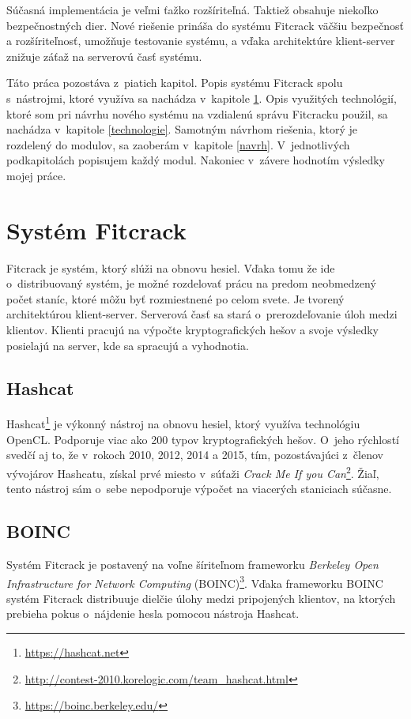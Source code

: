\documentclass[slovak]{fitthesis}
\begin{document}
Súčasná implementácia je veľmi ťažko rozšíriteľná. Taktiež obsahuje niekoľko bezpečnostných dier. Nové riešenie prináša do systému Fitcrack väčšiu bezpečnosť a rozšíriteľnosť, umožňuje testovanie systému, a vďaka architektúre klient-server znižuje záťaž na serverovú časť systému.

Táto práca pozostáva z~piatich kapitol. Popis systému Fitcrack spolu s~nástrojmi, ktoré využíva sa nachádza v~kapitole \ref{Fitcrack}. Opis využitých technológií, ktoré som pri návrhu nového systému na vzdialenú správu Fitcracku použil, sa nachádza v~kapitole \ref{technologie}. Samotným návrhom riešenia, ktorý je rozdelený do modulov, sa zaoberám v~kapitole \ref{navrh}. V~jednotlivých podkapitolách popisujem každý modul. Nakoniec v~závere hodnotím výsledky mojej práce. 



\chapter{Systém Fitcrack}\label{Fitcrack}
Fitcrack je systém, ktorý slúži na obnovu hesiel. Vďaka tomu že ide o~distribuovaný systém, je možné rozdelovať prácu na predom neobmedzený počet staníc, ktoré môžu byť rozmiestnené po celom svete. Je tvorený  architektúrou klient-server. Serverová časť sa stará o~prerozdeľovanie úloh medzi klientov. Klienti pracujú na výpočte kryptografických hešov a svoje výsledky posielajú na server, kde sa spracujú a vyhodnotia.
\cite{fitcrackSprava}


\section{Hashcat}\label{hashcat}
Hashcat\footnote{\url{https://hashcat.net}} je výkonný nástroj na obnovu hesiel, ktorý využíva technológiu OpenCL. Podporuje viac ako 200 typov kryptografických hešov. O~jeho rýchlostí svedčí aj to, že v~rokoch 2010, 2012, 2014 a 2015, tím, pozostávajúci z~členov vývojárov Hashcatu, získal prvé miesto v~súťaži \textit{Crack Me If you Can}\footnote{\url{http://contest-2010.korelogic.com/team_hashcat.html}}. Žiaľ, tento nástroj sám o~sebe nepodporuje výpočet na viacerých staniciach súčasne.


\section{BOINC} \label{BOINC}
Systém Fitcrack je postavený na voľne šíriteľnom frameworku \textit{Berkeley Open Infrastructure for Network Computing} (BOINC)\footnote{\url{https://boinc.berkeley.edu/}}. Vďaka frameworku BOINC systém Fitcrack distribuuje dielčie úlohy medzi pripojených klientov, na ktorých prebieha pokus o~nájdenie hesla pomocou nástroja Hashcat.
\end{document}
